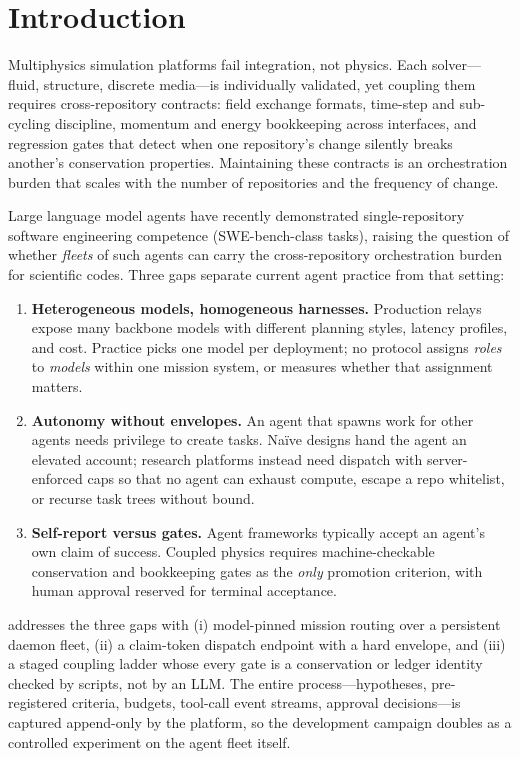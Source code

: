 \section{Introduction}\label{sec:intro}

Multiphysics simulation platforms fail integration, not physics. Each
solver---fluid, structure, discrete media---is individually validated,
yet coupling them requires cross-repository contracts: field exchange
formats, time-step and sub-cycling discipline, momentum and energy
bookkeeping across interfaces, and regression gates that detect when one
repository's change silently breaks another's conservation properties.
Maintaining these contracts is an orchestration burden that scales with
the number of repositories and the frequency of change.

Large language model agents have recently demonstrated single-repository
software engineering competence (SWE-bench-class tasks), raising the
question of whether \emph{fleets} of such agents can carry the
cross-repository orchestration burden for scientific codes. Three gaps
separate current agent practice from that setting:

\begin{enumerate}
\item \textbf{Heterogeneous models, homogeneous harnesses.} Production
relays expose many backbone models with different planning styles,
latency profiles, and cost. Practice picks one model per deployment;
no protocol assigns \emph{roles} to \emph{models} within one mission
system, or measures whether that assignment matters.
\item \textbf{Autonomy without envelopes.} An agent that spawns work for
other agents needs privilege to create tasks. Na\"ive designs hand the
agent an elevated account; research platforms instead need dispatch with
server-enforced caps so that no agent can exhaust compute, escape a repo
whitelist, or recurse task trees without bound.
\item \textbf{Self-report versus gates.} Agent frameworks typically
accept an agent's own claim of success. Coupled physics requires
machine-checkable conservation and bookkeeping gates as the \emph{only}
promotion criterion, with human approval reserved for terminal
acceptance.
\end{enumerate}

\sysname{} addresses the three gaps with (i) model-pinned mission
routing over a persistent daemon fleet, (ii) a claim-token dispatch
endpoint with a hard envelope, and (iii) a staged coupling ladder whose
every gate is a conservation or ledger identity checked by scripts, not
by an LLM. The entire process---hypotheses, pre-registered criteria,
budgets, tool-call event streams, approval decisions---is captured
append-only by the platform, so the development campaign doubles as a
controlled experiment on the agent fleet itself.

